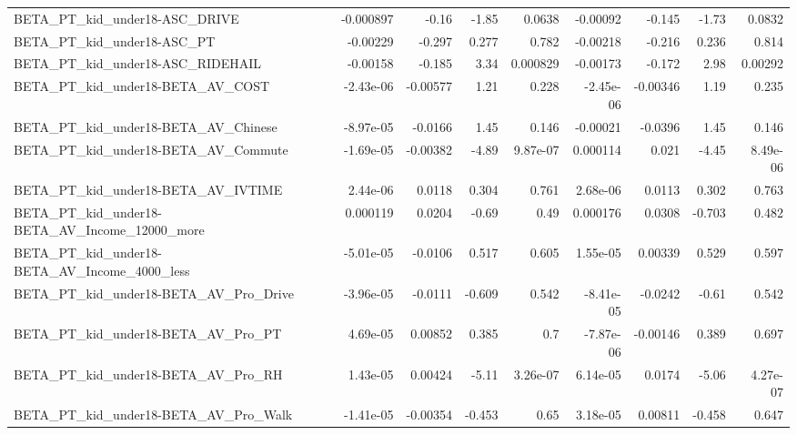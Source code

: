 \begin{tabular}{lrrrrrrrr}
BETA\_PT\_kid\_under18-ASC\_DRIVE                      &   -0.000897 &        -0.16 &     -1.85 &   0.0638 &   -0.00092 &      -0.145 &        -1.73 &        0.0832 \\
BETA\_PT\_kid\_under18-ASC\_PT                         &    -0.00229 &       -0.297 &     0.277 &    0.782 &   -0.00218 &      -0.216 &        0.236 &         0.814 \\
BETA\_PT\_kid\_under18-ASC\_RIDEHAIL                   &    -0.00158 &       -0.185 &      3.34 & 0.000829 &   -0.00173 &      -0.172 &         2.98 &       0.00292 \\
BETA\_PT\_kid\_under18-BETA\_AV\_COST                   &   -2.43e-06 &     -0.00577 &      1.21 &    0.228 &  -2.45e-06 &    -0.00346 &         1.19 &         0.235 \\
BETA\_PT\_kid\_under18-BETA\_AV\_Chinese                &   -8.97e-05 &      -0.0166 &      1.45 &    0.146 &   -0.00021 &     -0.0396 &         1.45 &         0.146 \\
BETA\_PT\_kid\_under18-BETA\_AV\_Commute                &   -1.69e-05 &     -0.00382 &     -4.89 & 9.87e-07 &   0.000114 &       0.021 &        -4.45 &      8.49e-06 \\
BETA\_PT\_kid\_under18-BETA\_AV\_IVTIME                 &    2.44e-06 &       0.0118 &     0.304 &    0.761 &   2.68e-06 &      0.0113 &        0.302 &         0.763 \\
BETA\_PT\_kid\_under18-BETA\_AV\_Income\_12000\_more      &    0.000119 &       0.0204 &     -0.69 &     0.49 &   0.000176 &      0.0308 &       -0.703 &         0.482 \\
BETA\_PT\_kid\_under18-BETA\_AV\_Income\_4000\_less       &   -5.01e-05 &      -0.0106 &     0.517 &    0.605 &   1.55e-05 &     0.00339 &        0.529 &         0.597 \\
BETA\_PT\_kid\_under18-BETA\_AV\_Pro\_Drive              &   -3.96e-05 &      -0.0111 &    -0.609 &    0.542 &  -8.41e-05 &     -0.0242 &        -0.61 &         0.542 \\
BETA\_PT\_kid\_under18-BETA\_AV\_Pro\_PT                 &    4.69e-05 &      0.00852 &     0.385 &      0.7 &  -7.87e-06 &    -0.00146 &        0.389 &         0.697 \\
BETA\_PT\_kid\_under18-BETA\_AV\_Pro\_RH                 &    1.43e-05 &      0.00424 &     -5.11 & 3.26e-07 &   6.14e-05 &      0.0174 &        -5.06 &      4.27e-07 \\
BETA\_PT\_kid\_under18-BETA\_AV\_Pro\_Walk               &   -1.41e-05 &     -0.00354 &    -0.453 &     0.65 &   3.18e-05 &     0.00811 &       -0.458 &         0.647 \\

\end{tabular}
